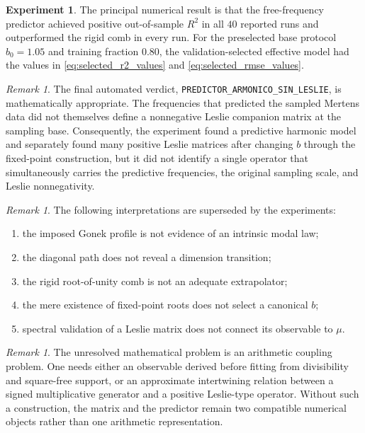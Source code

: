 \documentclass[11pt]{amsart}
\numberwithin{equation}{section}
\theoremstyle{plain}
\theoremstyle{definition}
\newtheorem{experiment}[theorem]{Experiment}
\theoremstyle{remark}
\newtheorem{remark}[theorem]{Remark}
\begin{document}
\begin{experiment}
\label{exp:numerical_survivor}
The principal numerical result is that the free-frequency predictor achieved positive out-of-sample $R^2$ in all $40$ reported runs and outperformed the rigid comb in every run.  For the preselected base protocol $b_0=1.05$ and training fraction $0.80$, the validation-selected effective model had the values in \eqref{eq:selected_r2_values} and \eqref{eq:selected_rmse_values}.
\end{experiment}

\begin{remark}
\label{rem:final_negative_result}
The final automated verdict, \texttt{PREDICTOR\_ARMONICO\_SIN\_LESLIE}, is mathematically appropriate.  The frequencies that predicted the sampled Mertens data did not themselves define a nonnegative Leslie companion matrix at the sampling base.  Consequently, the experiment found a predictive harmonic model and separately found many positive Leslie matrices after changing $b$ through the fixed-point construction, but it did not identify a single operator that simultaneously carries the predictive frequencies, the original sampling scale, and Leslie nonnegativity.
\end{remark}

\begin{remark}
\label{rem:what_has_failed}
The following interpretations are superseded by the experiments:
\begin{enumerate}[leftmargin=2em]
\item the imposed Gonek profile is not evidence of an intrinsic modal law;
\item the diagonal path does not reveal a dimension transition;
\item the rigid root-of-unity comb is not an adequate extrapolator;
\item the mere existence of fixed-point roots does not select a canonical $b$;
\item spectral validation of a Leslie matrix does not connect its observable to $\mu$.
\end{enumerate}
\end{remark}

\begin{remark}
\label{rem:what_remains_open}
The unresolved mathematical problem is an arithmetic coupling problem.  One needs either an observable derived before fitting from divisibility and square-free support, or an approximate intertwining relation between a signed multiplicative generator and a positive Leslie-type operator.  Without such a construction, the matrix and the predictor remain two compatible numerical objects rather than one arithmetic representation.
\end{remark}
\end{document}
